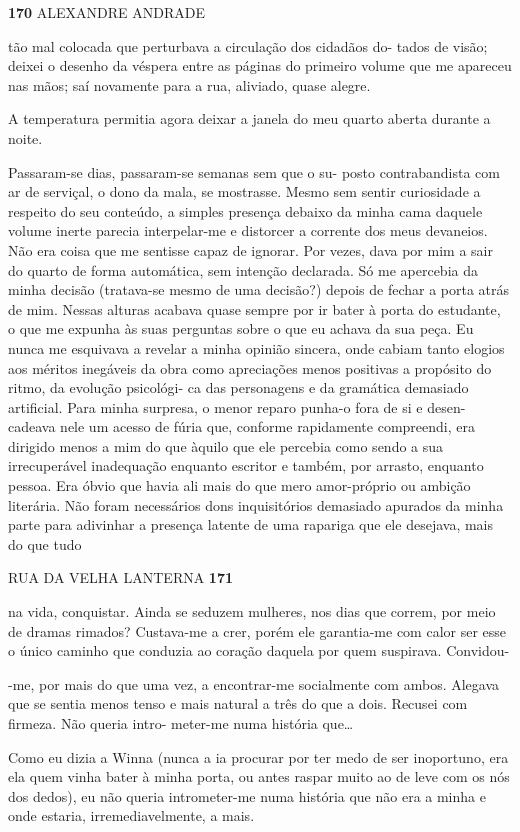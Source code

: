 \textbf{170 }ALEXANDRE ANDRADE

tão mal colocada que perturbava a circulação dos cidadãos do- tados de
visão; deixei o desenho da véspera entre as páginas do primeiro volume
que me apareceu nas mãos; saí novamente para a rua, aliviado, quase
alegre.

A temperatura permitia agora deixar a janela do meu quarto aberta
durante a noite.

Passaram-se dias, passaram-se semanas sem que o su- posto contrabandista
com ar de serviçal, o dono da mala, se mostrasse. Mesmo sem sentir
curiosidade a respeito do seu conteúdo, a simples presença debaixo da
minha cama daquele volume inerte parecia interpelar-me e distorcer a
corrente dos meus devaneios. Não era coisa que me sentisse capaz de
ignorar. Por vezes, dava por mim a sair do quarto de forma automática,
sem intenção declarada. Só me apercebia da minha decisão (tratava-se
mesmo de uma decisão?) depois de fechar a porta atrás de mim. Nessas
alturas acabava quase sempre por ir bater à porta do estudante, o que me
expunha às suas perguntas sobre o que eu achava da sua peça. Eu nunca me
esquivava a revelar a minha opinião sincera, onde cabiam tanto elogios
aos méritos inegáveis da obra como apreciações menos positivas a
propósito do ritmo, da evolução psicológi- ca das personagens e da
gramática demasiado artificial. Para minha surpresa, o menor reparo
punha-o fora de si e desen- cadeava nele um acesso de fúria que,
conforme rapidamente compreendi, era dirigido menos a mim do que àquilo
que ele percebia como sendo a sua irrecuperável inadequação enquanto
escritor e também, por arrasto, enquanto pessoa. Era óbvio que havia ali
mais do que mero amor-próprio ou ambição literária. Não foram
necessários dons inquisitórios demasiado apurados da minha parte para
adivinhar a presença latente de uma rapariga que ele desejava, mais do
que tudo

RUA DA VELHA LANTERNA \textbf{171}

na vida, conquistar. Ainda se seduzem mulheres, nos dias que correm, por
meio de dramas rimados? Custava-me a crer, porém ele garantia-me com
calor ser esse o único caminho que conduzia ao coração daquela por quem
suspirava. Convidou-

-me, por mais do que uma vez, a encontrar-me socialmente com ambos.
Alegava que se sentia menos tenso e mais natural a três do que a dois.
Recusei com firmeza. Não queria intro- meter-me numa história
que\ldots{}

Como eu dizia a Winna (nunca a ia procurar por ter medo de ser
inoportuno, era ela quem vinha bater à minha porta, ou antes raspar
muito ao de leve com os nós dos dedos), eu não queria intrometer-me numa
história que não era a minha e onde estaria, irremediavelmente, a mais.

